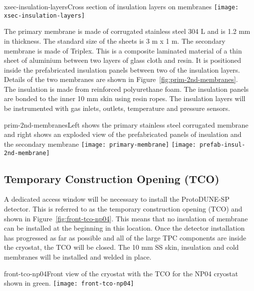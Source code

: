 \begin{cdrfigure}{xsec-insulation-layers}{Cross section of insulation layers on membranes}
  \texttt{[image: xsec-insulation-layers]}
\end{cdrfigure}


The primary membrane is made of corrugated stainless steel 304 L and is 1.2 mm in thickness.  The standard size of the sheets is 3 m x 1 m.  The secondary membrane is made of Triplex.  This is a composite laminated material of a thin sheet of aluminium between two layers of glass cloth and resin.  It is positioned inside the prefabricated insulation panels between two of the insulation layers.  Details of the two membranes are shown in Figure~\ref{fig:prim-2nd-membranes}.   The insulation is made from reinforced polyurethane foam.  The insulation panels are bonded to the inner 10 mm skin using resin ropes.  The insulation layers will be instrumented with gas inlets, outlets, temperature and pressure sensors.

\begin{cdrfigure}{prim-2nd-membranes}{Left shows the primary stainless steel corrugated membrane and right shows an exploded view of the prefabricated panels of insulation and the secondary membrane}
  \texttt{[image: primary-membrane]}
  \texttt{[image: prefab-insul-2nd-membrane]}
\end{cdrfigure}

\subsection{Temporary Construction Opening (TCO)}

A dedicated access window will be necessary to install the ProtoDUNE-SP detector.  This is referred to as the temporary construction opening (TCO) and shown in Figure~\ref{fig:front-tco-np04}.  This means that no insulation of membrane can be installed at the beginning in this location. Once the detector installation has progressed as far as possible and all of the large TPC components are inside the cryostat, the TCO will be closed.  The 10 mm SS skin, insulation and cold membranes will be installed and welded in place. 

\begin{cdrfigure}{front-tco-np04}{Front view of the cryostat with the TCO for the NP04 cryostat shown in green.}
  \texttt{[image: front-tco-np04]}
\end{cdrfigure}


